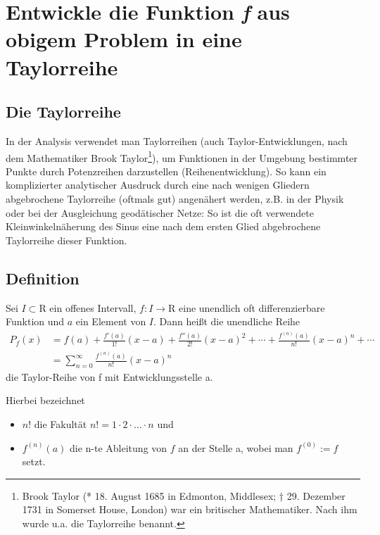\chapter{Entwickle die Funktion \emph{f} aus obigem Problem in eine Taylorreihe}

\section{Die Taylorreihe}
In der Analysis verwendet man Taylorreihen (auch Taylor-Entwicklungen, nach dem Mathematiker Brook
Taylor\footnote{Brook Taylor (* 18. August 1685 in Edmonton, Middlesex; † 29. Dezember 1731 in
Somerset House, London) war ein britischer Mathematiker. Nach ihm wurde u.a. die Taylorreihe
benannt.}), um Funktionen in der Umgebung bestimmter Punkte durch Potenzreihen darzustellen
(Reihenentwicklung). So kann ein komplizierter analytischer Ausdruck durch eine nach wenigen
Gliedern abgebrochene Taylorreihe (oftmals gut) angenähert werden, z.B. in der Physik oder bei der
Ausgleichung geodätischer Netze: So ist die oft verwendete Kleinwinkelnäherung des Sinus eine nach
dem ersten Glied abgebrochene Taylorreihe dieser Funktion.

\section{Definition}
Sei \( I \subset \mathrm{R} \) ein offenes Intervall, \( f \colon I \rightarrow \mathrm{R} \) eine
unendlich oft differenzierbare Funktion und \(a\) ein Element von \(I\). Dann heißt die unendliche
Reihe
\begin{align}
        \label{eq:taylorreihe1}
P_f(x)  & = f(a) + \frac{f'(a)}{1!} (x-a) + \frac{f''(a)}{2!} (x-a)^2 + \dotsb +
            \frac{f^{(n)}(a)}{n!} (x-a)^n + \dotsb\\
        \label{eq:taylorreihe2}
        & = \sum_{n=0}^\infty \frac{f^{(n)}(a)}{n!} (x-a)^n
\end{align}
die Taylor-Reihe von f mit Entwicklungsstelle a.

Hierbei bezeichnet
\begin{itemize}
    \item   \(n!\) die Fakultät \(n! = 1 \cdot 2 \cdot \dots \cdot n\) und
    \item   \(f^{(n)}(a)\) die n-te Ableitung von \(f\) an der Stelle a, wobei man \(f^{(0)} := f\)
            setzt.
\end{itemize}

